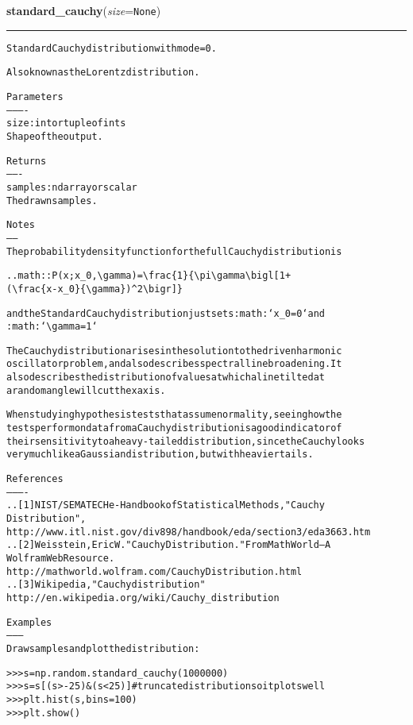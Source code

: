 \hspace{.8\funcindent}\begin{boxedminipage}{\funcwidth}

    \raggedright \textbf{standard\_cauchy}(\textit{size}={\tt None})

    \vspace{-1.5ex}

    \rule{\textwidth}{0.5\fboxrule}
\setlength{\parskip}{2ex}
\begin{alltt}
Standard Cauchy distribution with mode = 0.

Also known as the Lorentz distribution.

Parameters
----------
size : int or tuple of ints
    Shape of the output.

Returns
-------
samples : ndarray or scalar
    The drawn samples.

Notes
-----
The probability density function for the full Cauchy distribution is

.. math:: P(x; x\_0, {\textbackslash}gamma) = {\textbackslash}frac\{1\}\{{\textbackslash}pi {\textbackslash}gamma {\textbackslash}bigl[ 1+
          ({\textbackslash}frac\{x-x\_0\}\{{\textbackslash}gamma\}){\textasciicircum}2 {\textbackslash}bigr] \}

and the Standard Cauchy distribution just sets :math:`x\_0=0` and
:math:`{\textbackslash}gamma=1`

The Cauchy distribution arises in the solution to the driven harmonic
oscillator problem, and also describes spectral line broadening. It
also describes the distribution of values at which a line tilted at
a random angle will cut the x axis.

When studying hypothesis tests that assume normality, seeing how the
tests perform on data from a Cauchy distribution is a good indicator of
their sensitivity to a heavy-tailed distribution, since the Cauchy looks
very much like a Gaussian distribution, but with heavier tails.

References
----------
..[1] NIST/SEMATECH e-Handbook of Statistical Methods, "Cauchy
      Distribution",
      http://www.itl.nist.gov/div898/handbook/eda/section3/eda3663.htm
..[2] Weisstein, Eric W. "Cauchy Distribution." From MathWorld--A
      Wolfram Web Resource.
      http://mathworld.wolfram.com/CauchyDistribution.html
..[3] Wikipedia, "Cauchy distribution"
      http://en.wikipedia.org/wiki/Cauchy\_distribution

Examples
--------
Draw samples and plot the distribution:

{\textgreater}{\textgreater}{\textgreater} s = np.random.standard\_cauchy(1000000)
{\textgreater}{\textgreater}{\textgreater} s = s[(s{\textgreater}-25) \& (s{\textless}25)]  \# truncate distribution so it plots well
{\textgreater}{\textgreater}{\textgreater} plt.hist(s, bins=100)
{\textgreater}{\textgreater}{\textgreater} plt.show()
\end{alltt}

\setlength{\parskip}{1ex}
    \end{boxedminipage}


